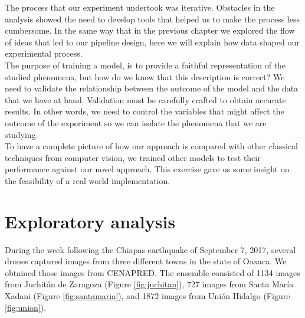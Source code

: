 The process that our experiment undertook was iterative. Obstacles in the analysis showed the need to develop tools that helped us to make the process less cumbersome. In the same way that in the previous chapter we explored the flow of ideas that led to our pipeline design, here we will explain how data shaped our experimental process.\\

The purpose of training a model, is to provide a faithful representation of the  studied phenomena, but how do we know that this description is correct? We need to validate the relationship between the outcome of the model and the data that we have at hand. Validation must be carefully crafted to obtain accurate results. In other words, we need to control the variables that might affect the outcome of the experiment so we can isolate the phenomena that we are studying.\\

To have a complete picture of how our approach is compared with other classical techniques from  computer vision, we trained other models to test their performance against our novel approach. This exercise gave us some insight on the feasibility of a real world implementation.\\


\section{Exploratory analysis}

During the week following the Chiapas earthquake of September 7, 2017, several drones captured images from three different towns in the state of Oaxaca. We obtained those images from CENAPRED. The ensemble consisted of 1134 images from Juchit\'an de Zaragoza (Figure \ref{fig:juchitan}), 727 images from Santa Mar\'ia Xadani (Figure \ref{fig:santamaria}), and 1872 images from Uni\'on Hidalgo (Figure \ref{fig:union}).\\

